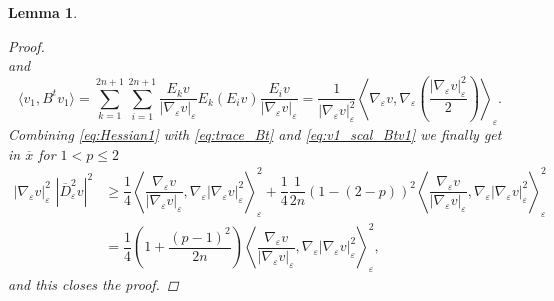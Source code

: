\documentclass[10pt]{amsart}
\numberwithin{equation}{section}
\newtheorem{lemma}[theorem]{Lemma}
\theoremstyle{definition}
\begin{document}
\begin{lemma}
\begin{proof}
\begin{equation}
		\end{equation}
		\noindent and
		\begin{equation}\label{eq:v1_scal_Btv1}
			\langle v_1, B^{t}v_1 \rangle = \sum_{k=1}^{2n+1}\sum_{i=1}^{2n+1}\dfrac{E_k v}{|\nabla_{\varepsilon}v|_{\varepsilon}} E_k(E_i v)\dfrac{E_i v}{|\nabla_{\varepsilon}v|_{\varepsilon}} = \dfrac{1}{|\nabla_{\varepsilon}v|_{\varepsilon}^2} \left\langle \nabla_{\varepsilon}v
			, \nabla_{\varepsilon}	\left(\dfrac{|\nabla_{\varepsilon}v|_{\varepsilon}^2}{2}\right)\right\rangle_{\varepsilon}.
		\end{equation}
		Combining \eqref{eq:Hessian1} with \eqref{eq:trace_Bt} and \eqref{eq:v1_scal_Btv1} we finally get in $\overline{x}$ for $1<p \leq 2$
		\begin{equation*}
			\begin{aligned}
				|\nabla_{\varepsilon}v|^{2}_\varepsilon\, \, |\overline{D}^{2}_{\varepsilon}v|^2 & \geq \dfrac{1}{4} \left\langle \dfrac{\nabla_{\varepsilon}v}{|\nabla_{\varepsilon}v|_{\varepsilon}}, \nabla_{\varepsilon}|\nabla_{\varepsilon}v|_{\varepsilon}^2 \right\rangle^2_{\varepsilon} + \dfrac{1}{4} \dfrac{1}{2n} (1-(2-p))^2 \left\langle \dfrac{\nabla_{\varepsilon}v}{|\nabla_{\varepsilon}v|_{\varepsilon}}, \nabla_{\varepsilon}|\nabla_{\varepsilon}v|_{\varepsilon}^2 \right\rangle^2_{\varepsilon}\\
				&= \dfrac{1}{4}\left(1+\dfrac{(p-1)^2}{2n}\right)\left\langle \dfrac{\nabla_{\varepsilon}v}{|\nabla_{\varepsilon}v|_{\varepsilon}}, \nabla_{\varepsilon}|\nabla_{\varepsilon}v|_{\varepsilon}^2\right\rangle_{\varepsilon}^2,
			\end{aligned}
		\end{equation*}
		\noindent and this closes the proof.
	\end{proof}
\end{lemma}
\end{document}
